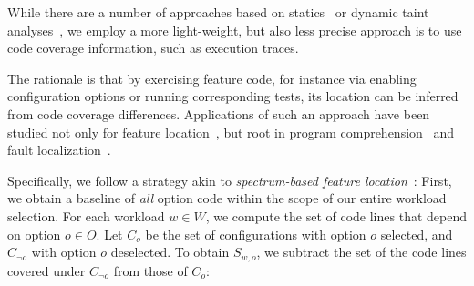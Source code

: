 {While there are a number of approaches based on statics~\cite{velez_2020_configcrusher_jase,lillack_2018_lotrack_tse,luo_2019_cova} or dynamic taint analyses~\cite{bell_phosphor_2014,velez_comprex_2021,splat_kim_2013}, we employ a more light-weight,  but also less precise approach is to use code coverage information, such as execution traces.

The rationale is that by exercising feature code, for instance via enabling configuration options or running corresponding tests, its location can be inferred from code coverage differences. Applications of such an approach have been studied not only for feature location~\cite{wong_integrated_2005,sulir_annotation_2015,michelon_spectrum_2021,perez_framing_2016}, but root in program comprehension~\cite{wilde_early_1996,wilde_reconnaissance_1995,sherwood_reducing_nodate,perez_diagnosis_2014,castro_pangolin_2019} and fault localization~\cite{agrawal_fault_1995,wong_faultloc_2016}. 
}
Specifically, we follow  a strategy akin to  \textit{spectrum-based feature location}~\cite{michelon_spectrum_2021}:
First, we obtain a baseline of \textit{all} option code within the scope of our entire workload selection. For each workload $w \in W$, we compute the set of code lines that depend on option $o \in O$. Let $C_{o}$ be the set of configurations with option $o$ selected, and $C_{\neg o}$ with option $o$ deselected. To obtain $S_{w, o}$, we subtract the set of the code lines covered under $C_{\neg o}$ from those of $C_{o}$:

